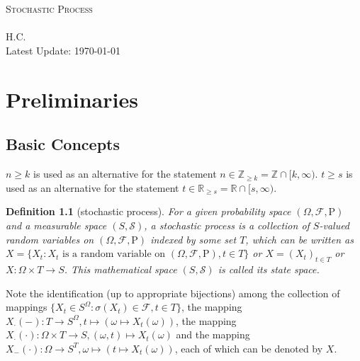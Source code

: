 \documentclass{report}
\newtheorem{definition}{Definition}[section]
\theoremstyle{nonumberplain}
\begin{document}
	  

~\\
\begin{center}	
	~\\ 
	\vspace{6em} 
	\textsc{\Huge Stochastic Process}	
	~\\
	\vspace{2.5em} 
	{\Large }
	~\\
	\vspace{6em}
	\textsf{H.C.}
	~\\
	\vspace{5in}  
	{\large Latest Update: \today}
\end{center}
\tableofcontents
\chapter{Preliminaries}
\section{Basic Concepts}
$n \ge k$ is used as an alternative for the
statement $n\in\mathbb{Z}_{\ge k}=\mathbb{Z}\cap[k,\infty)$. $t \ge s$ is used as an alternative for the statement $t\in\mathbb{R}_{\ge s}=\mathbb{R}\cap[s,\infty)$.
\begin{definition}[stochastic process]
For a given probability space $(\Omega ,{\mathcal{F}},\mathrm{P})$ and a measurable space $(S,\mathcal{S})$, a \emph{stochastic process} is a collection of $S$-valued random variables on $(\Omega ,{\mathcal{F}},\mathrm{P})$ indexed by some set $T$, which can be written as $X=\{X_t:X_t\text{ is a random variable on } (\Omega ,\mathcal{F},\mathrm{P}),t\in T\}$ or $X=(X_t)_{t\in T}$ or $X:\Omega \times T\rightarrow S$. This mathematical space $(S,\mathcal{S})$ is called its state space. 
\end{definition}

Note the identification (up to appropriate bijections) among the collection of mappings $\{X_t\in S^\Omega:\sigma(X_t)\in\mathcal{F},t\in T\}$, the mapping $X_\cdot(-):T \to S^\Omega,t\mapsto\left(\omega\mapsto X_{t}(\omega)\right)$, the mapping $X_\cdot(\cdot):\Omega \times T\rightarrow S,(\omega,t)\mapsto X_t(\omega)$ and the mapping $X_{-}(\cdot):\Omega\to S^T,\omega\mapsto \left(t\mapsto X_{t}(\omega)\right)$, each of which can be denoted by $X$.
\end{document}
